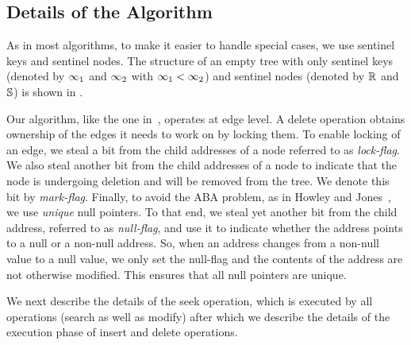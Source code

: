 \subsection{Details of the Algorithm}
As in most algorithms, to make it easier to handle special cases, we use sentinel keys and sentinel nodes.  The structure of an empty tree with only sentinel keys (denoted by $\infty_1$ and $\infty_2$ with $\infty_1{} < \infty_2{}$) and sentinel nodes (denoted by $\mathbb{R}$ and $\mathbb{S}$) is shown in .


Our algorithm, like the one in~\cite{NatMit:2014:PPoPP}, operates at edge level. A delete operation obtains ownership of the edges it needs to work on by locking them. To enable locking of an edge, we steal a bit from the child addresses of a node referred to as \emph{lock-flag}. We also steal another bit from the child addresses of a node to indicate that the node is undergoing deletion and will be removed from the tree. We denote this bit by \emph{mark-flag}. 
Finally, to avoid the ABA problem, as in Howley and Jones~\cite{HowJon:2012:SPAA}, we use \emph{unique} null pointers. To that end, we steal yet another bit from the child address, referred to as \emph{null-flag}, and use it to indicate whether the address points to a null or a non-null address. So, when an address changes from a non-null value to a null value, we only set the null-flag and the contents of the address are not otherwise modified. This ensures that all null pointers are unique.

We next describe the details of the seek operation, which is executed by all operations (search as well as modify) after which we describe the details of the execution phase of insert and delete operations.

